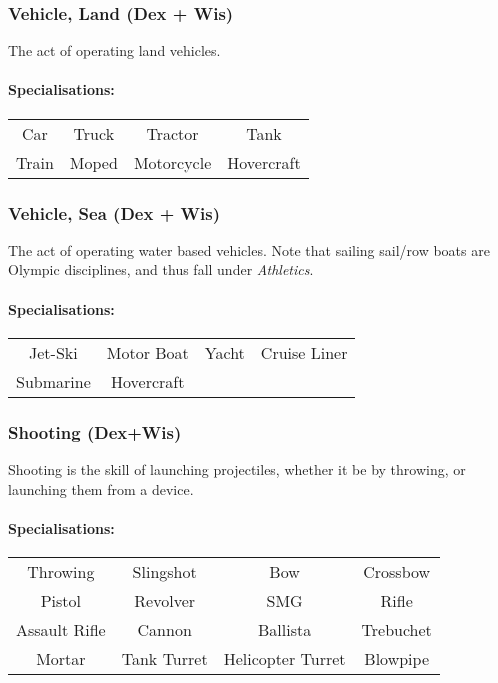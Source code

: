 \subsubsection{Vehicle, Land (Dex + Wis)}
The act of operating land vehicles.

\paragraph{Specialisations:}
\begin{center}
    \begin{tabular}{c|c|c|c}
        Car & Truck & Tractor & Tank \\
        Train & Moped & Motorcycle & Hovercraft
    \end{tabular}
\end{center}

\subsubsection{Vehicle, Sea (Dex + Wis)}
The act of operating water based vehicles.
Note that sailing sail/row boats are Olympic disciplines, and thus fall under \textit{Athletics}.

\paragraph{Specialisations:}
\begin{center}
    \begin{tabular}{c|c|c|c}
        Jet-Ski & Motor Boat & Yacht & Cruise Liner \\
        Submarine & Hovercraft & 
    \end{tabular}
\end{center}

\subsubsection{Shooting (Dex+Wis)}
Shooting is the skill of launching projectiles, whether it be by throwing, or launching them from a device.

\paragraph{Specialisations:}
\begin{center}
    \begin{tabular}{c|c|c|c}
        Throwing & Slingshot & Bow & Crossbow \\
        Pistol & Revolver & SMG & Rifle \\
        Assault Rifle & Cannon & Ballista & Trebuchet \\
        Mortar & Tank Turret & Helicopter Turret & Blowpipe
    \end{tabular}
\end{center}

